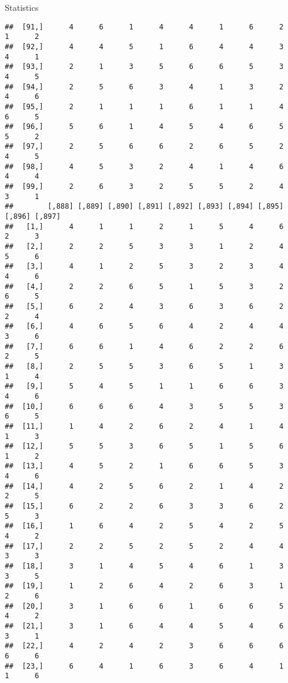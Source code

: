 \documentclass[
  ignorenonframetext,
]{beamer}
\begin{document}
\begin{frame}[fragile]{Statistics}
\begin{verbatim}
##  [91,]      4      6      1      4      4      1      6      2      1      2
##  [92,]      4      4      5      1      6      4      4      3      4      1
##  [93,]      2      1      3      5      6      6      5      3      4      5
##  [94,]      2      5      6      3      4      1      3      2      4      6
##  [95,]      2      1      1      1      6      1      1      4      6      5
##  [96,]      5      6      1      4      5      4      6      5      5      2
##  [97,]      2      5      6      6      2      6      5      2      4      5
##  [98,]      4      5      3      2      4      1      4      6      4      4
##  [99,]      2      6      3      2      5      5      2      4      3      1
##        [,888] [,889] [,890] [,891] [,892] [,893] [,894] [,895] [,896] [,897]
##   [1,]      4      1      1      2      1      5      4      6      2      3
##   [2,]      2      2      5      3      3      1      2      4      5      6
##   [3,]      4      1      2      5      3      2      3      4      4      6
##   [4,]      2      2      6      5      1      5      3      2      6      5
##   [5,]      6      2      4      3      6      3      6      2      2      4
##   [6,]      4      6      5      6      4      2      4      4      3      6
##   [7,]      6      6      1      4      6      2      2      6      2      5
##   [8,]      2      5      5      3      6      5      1      3      1      4
##   [9,]      5      4      5      1      1      6      6      3      4      6
##  [10,]      6      6      6      4      3      5      5      3      6      5
##  [11,]      1      4      2      6      2      4      1      4      1      3
##  [12,]      5      5      3      6      5      1      5      6      1      2
##  [13,]      4      5      2      1      6      6      5      3      4      6
##  [14,]      4      2      5      6      2      1      4      2      2      5
##  [15,]      6      2      2      6      3      3      6      2      5      3
##  [16,]      1      6      4      2      5      4      2      5      4      2
##  [17,]      2      2      5      2      5      2      4      4      3      3
##  [18,]      3      1      4      5      4      6      1      3      3      5
##  [19,]      1      2      6      4      2      6      3      1      2      6
##  [20,]      3      1      6      6      1      6      6      5      4      2
##  [21,]      3      1      6      4      4      5      4      6      3      1
##  [22,]      4      2      4      2      3      6      6      6      6      6
##  [23,]      6      4      1      6      3      6      4      1      1      6

\end{verbatim}
\end{frame}
\end{document}
